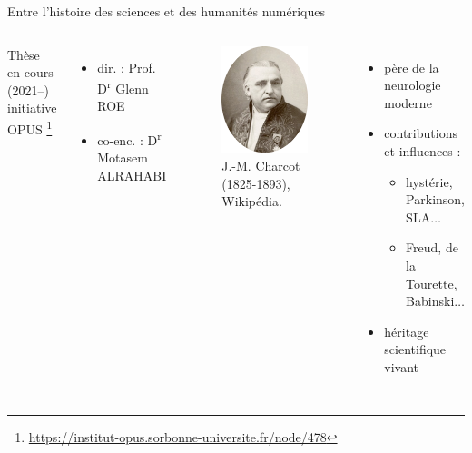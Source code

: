 \begin{frame}{Entre l'histoire des sciences et des humanités numériques}
	\begin{columns}
		Thèse en cours (2021--) \\
		\footnotesize{initiative \textsc{OPUS}}%
		\setcounter{footnote}{1}%
		\footnote{\url{https://institut-opus.sorbonne-universite.fr/node/478}}\\
		\begin{itemize}
			\footnotesize
			\item dir. : Prof. D\textsuperscript{r} Glenn ROE
			\item co-enc. : D\textsuperscript{r} Motasem ALRAHABI
		\end{itemize}
		\begin{figure}
			\centering
			\includegraphics[width=.20\textwidth]{pic/Jean-Martin_Charcot-modified.png}
			\caption{J.-M. Charcot (1825-1893), \href{https://fr.wikipedia.org/wiki/Jean-Martin_Charcot\#/media/Fichier:Jean-Martin\_Charcot.jpg}\\
				{Wikipédia}.}
		\end{figure}
					\begin{itemize}
			\small
			\item père de la neurologie moderne
			\item contributions et influences : 
			\begin{itemize}
				\footnotesize
				\item hystérie, \og{}Parkinson\fg{}, \textsc{SLA}$\dots$
				\item Freud, de la Tourette, Babinski$\dots$
			\end{itemize}
			\item héritage scientifique vivant

			
		\end{itemize}
	\end{columns}

\end{frame}
